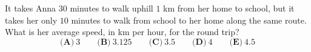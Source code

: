It takes Anna $30$ minutes to walk uphill $1$ km from her home to school, but it takes her only $10$ minutes to walk from school to her home along the same route. What is her average speed, in km per hour, for the round trip?
\[\textbf{(A)}\ 3\qquad\textbf{(B)}\ 3.125\qquad\textbf{(C)}\ 3.5\qquad\textbf{(D)}\ 4\qquad\textbf{(E)}\ 4.5\]
